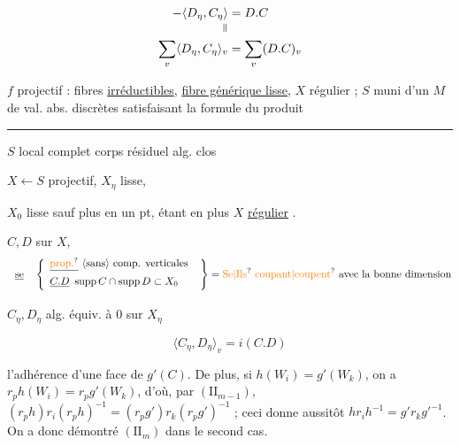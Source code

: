 \[
\begin{aligned}
-\langle D_{\eta},C_{\eta}\rangle&=D.C\\[-2pt]
\rotatebox{90}{$=$}&\\[-2pt]
\sum_v\langle D_{\eta},C_{\eta}\rangle_v&=\sum_v(D.C)_v
\end{aligned}
\]

$f$ projectif : fibres  \uline{irréductibles}, \uline{fibre générique lisse}, $X$ régulier ; $S$ muni d'un  $M$ de val. abs. discrètes satisfaisant la formule du produit

\smallskip\hrule\smallskip

$S$ local complet corps résiduel alg. clos

$X\leftarrow S$ projectif, $X_{\eta}$ lisse,

$X_0$ lisse sauf  plus en un pt,   étant en plus $X$ \uline{régulier} .

$C,D$ sur $X$,
\[
\left.
\begin{array}{l}
\deleted{\text{se}}\quad
\left\{\begin{array}{l}
\deleted{\text{\unsure{prop.}}}\ \text{\inserted{sans} comp. verticales}\\
\deleted{C.D}\ \operatorname{supp} C\cap\operatorname{supp} D\subset X_0
\end{array}\right.
\end{array}
\right\}=\text{\unsure{Se|Ils} \unsure{coupant|coupent} avec la bonne dimension}
\]

$C_{\eta},D_{\eta}$ alg. équiv. à $0$ sur $X_{\eta}$

\[
\boxed{\langle C_{\eta},D_{\eta}\rangle_v=i(C.D)}
\]

l'adhérence d'une face de $g'(C)$. De plus, si $h(W_i)=g'(W_k)$, on a $r_p h(W_i)=r_p g'(W_k)$, d'où, par $(\mathrm{II}_{m-1})$, $(r_p h)r_i(r_p h)^{-1}=(r_p g')r_k(r_p g')^{-1}$ ; ceci donne aussitôt $hr_i h^{-1}=g'r_k g'^{-1}$. On a donc démontré $(\mathrm{II}_m)$ dans le second cas.

